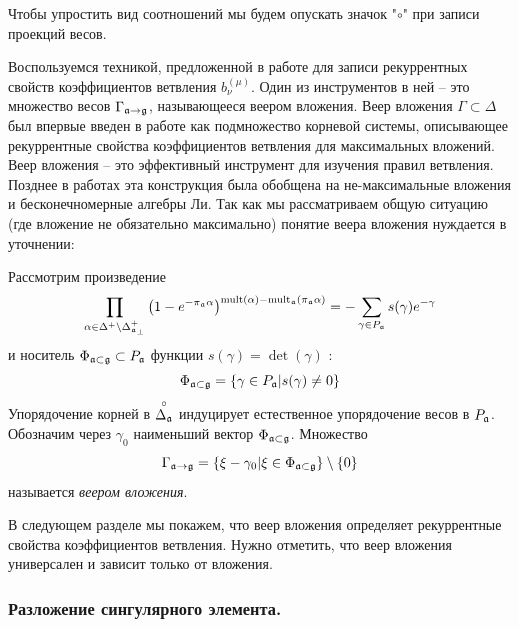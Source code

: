Чтобы упростить вид соотношений мы будем опускать значок "$\circ$" при записи проекций весов.

Воспользуемся техникой, предложенной в работе  \cite{ilyin812pbc} для записи рекуррентных свойств коэффициентов ветвления $b_{\nu}^{(\mu )}$. Один из инструментов в ней -- это множество весов $\Gamma_{\mathfrak{a}\rightarrow \mathfrak{g}}$, называющееся веером вложения. Веер вложения  $\Gamma\subset \Delta$ был впервые введен в работе  \cite{lyakhovsky1996rra} как подмножество корневой системы, описывающее рекуррентные свойства коэффициентов ветвления для максимальных вложений. Веер вложения -- это эффективный инструмент для изучения правил ветвления. Позднее в работах \cite{2010arXiv1007.0318L, ilyin812pbc} эта конструкция была обобщена на не-максимальные вложения и бесконечномерные алгебры Ли. Так как мы рассматриваем общую ситуацию (где вложение не обязательно максимально) понятие веера вложения нуждается в уточнении:
\begin{definition}
\label{fan-definition} Рассмотрим произведение
\begin{equation}
\prod_{\alpha \in \Delta ^{+}\setminus \Delta _{\afb }^{+}}\left( 1-e^{-\pi
_{\af}\alpha }\right) ^{\mathrm{mult}(\alpha )-\mathrm{mult}_{\af%
}(\pi _{\af}\alpha )}=-\sum_{\gamma \in P_{\af}}s(\gamma
)e^{-\gamma }  \label{eq:142}
\end{equation}
и носитель $\Phi _{\mathfrak{a}\subset \mathfrak{g}}\subset P_{\mathfrak{a}}$ функции $s(\gamma )=\det \left( \gamma \right) $ :
\begin{equation}
\Phi _{\mathfrak{a}\subset \mathfrak{g}}=\left\{ \gamma \in P_{\mathfrak{a}}|s(\gamma
)\neq 0\right\}   \label{eq:37}
\end{equation}
Упорядочение корней в  $\stackrel{\circ }{\Delta _{\mathfrak{a}}}$ индуцирует естественное упорядочение весов в $P_{\mathfrak{a}}$. Обозначим через $\gamma_{0}$ наименьший вектор $\Phi _{\mathfrak{a}\subset \mathfrak{g}}$. Множество
\begin{equation}
\Gamma _{\af\rightarrow \gf}=\left\{ \xi -\gamma _{0}|\xi \in \Phi _{%
\af\subset \gf}\right\} \setminus \left\{ 0\right\}
\label{fan-defined}
\end{equation}
называется  \textit{веером вложения}.
\end{definition}
В следующем разделе мы покажем, что веер вложения определяет рекуррентные свойства коэффициентов ветвления. Нужно отметить, что веер вложения универсален и зависит только от вложения. 

\subsubsection{Разложение сингулярного элемента.}
\label{subsec:decomp-sing-element}

